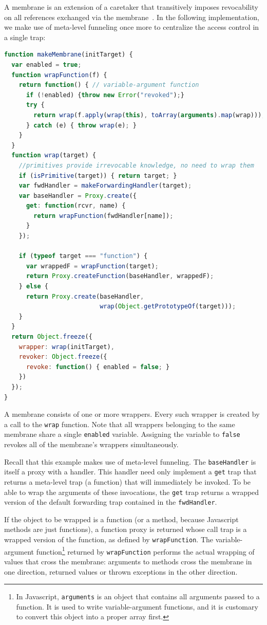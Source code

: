 \documentclass{sig-alternate}
\begin{document}
A membrane is an extension of a caretaker that transitively imposes revocability on all references exchanged via the membrane~\cite{miller06robust}. In the following implementation, we make use of meta-level funneling once more to centralize the access control in a single trap:

\begin{lstlisting}[language=javascript]
function makeMembrane(initTarget) {
  var enabled = true;
  function wrapFunction(f) {
    return function() { // variable-argument function
      if (!enabled) {throw new Error("revoked");}
      try {
        return wrap(f.apply(wrap(this), toArray(arguments).map(wrap)));
      } catch (e) { throw wrap(e); } 
    }
  }
  function wrap(target) {
    //primitives provide irrevocable knowledge, no need to wrap them
    if (isPrimitive(target)) { return target; }
    var fwdHandler = makeForwardingHandler(target);
    var baseHandler = Proxy.create({
      get: function(rcvr, name) {
        return wrapFunction(fwdHandler[name]);
      }
    });
    
    if (typeof target === "function") {
      var wrappedF = wrapFunction(target);
      return Proxy.createFunction(baseHandler, wrappedF);
    } else {
      return Proxy.create(baseHandler,
                          wrap(Object.getPrototypeOf(target)));
    }
  }
  return Object.freeze({
    wrapper: wrap(initTarget),
    revoker: Object.freeze({
      revoke: function() { enabled = false; }
    })
  });
}
\end{lstlisting}

A membrane consists of one or more wrappers. Every such wrapper is created by a call to the \texttt{wrap} function. Note that all wrappers belonging to the same membrane share a single \texttt{enabled} variable. Assigning the variable to \texttt{false} revokes all of the membrane's wrappers simultaneously.

Recall that this example makes use of meta-level funneling. The \texttt{baseHandler} is itself a proxy with a handler. This handler need only implement a \texttt{get} trap that returns a meta-level trap (a function) that will immediately be invoked. To be able to wrap the arguments of these invocations, the \texttt{get} trap returns a wrapped version of the default forwarding trap contained in the \texttt{fwdHandler}.

If the object to be wrapped is a function (or a method, because Javascript methods are just functions), a function proxy is returned whose call trap is a wrapped version of the function, as defined by \texttt{wrapFunction}. The variable-argument function\footnote{In Javascript, \texttt{arguments} is an object that contains all arguments passed to a function. It is used to write variable-argument functions, and it is customary to convert this object into a proper array first.} returned by \texttt{wrapFunction} performs the actual wrapping of values that cross the membrane: arguments to methods cross the membrane in one direction, returned values or thrown exceptions in the other direction.
\end{document}
